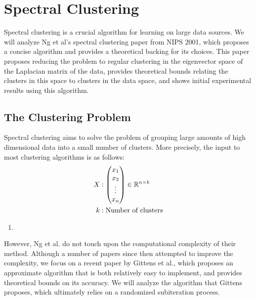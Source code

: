 \section{Spectral Clustering}

    Spectral clustering is a crucial algorithm for learning on large data
    sources. We will analyze Ng et al's \cite{ng2002spectral} spectral
    clustering paper from NIPS 2001, which proposes a concise algorithm and
    provides a theoretical backing for its choices. This paper proposes
    reducing the problem to regular clustering in the eigenvector space of the
    Laplacian matrix of the data, provides theoretical bounds relating the
    clusters in this space to clusters in the data space, and shows initial
    experimental results using this algorithm.

    \subsection{The Clustering Problem}
    Spectral clustering aims to solve the problem of grouping large amounts of
    high dimensional data into a small number of clusters. More precisely,
    the input to most clustering algorithms is as follows:
    \begin{align*}
    X &: \begin{pmatrix}x_1 \\ x_2 \\ \vdots \\ x_n \end{pmatrix} \in \mathbb{R}^{n \times k} \\
    k &: \text{Number of clusters}
    \end{align*}

    \begin{enumerate}
    \item
    \end{enumerate}

    However, Ng et al. do not touch upon the computational complexity of their method. Although a number of papers since then attempted to improve the complexity, we focus on a recent paper by Gittens et al.\cite{gittens2013approximate}, which proposes an approximate algorithm that is both relatively easy to implement, and provides theoretical bounds on its accuracy. We will analyze the algorithm that Gittens proposes, which ultimately relies on a randomized subiteration process.
